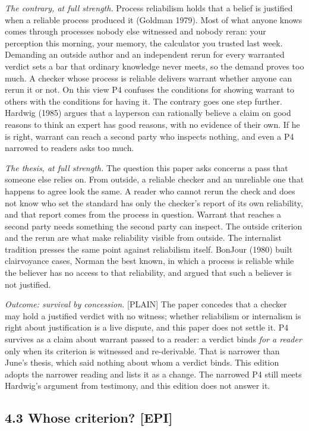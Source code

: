 \documentclass[11pt]{article}
\newcommand{\register}[1]{{\ttfamily\small #1}}
\begin{document}
\emph{The contrary, at full strength.} Process reliabilism holds that a belief is justified when a reliable process produced it (Goldman 1979). Most of what anyone knows comes through processes nobody else witnessed and nobody reran: your perception this morning, your memory, the calculator you trusted last week. Demanding an outside author and an independent rerun for every warranted verdict sets a bar that ordinary knowledge never meets, so the demand proves too much. A checker whose process is reliable delivers warrant whether anyone can rerun it or not. On this view P4 confuses the conditions for showing warrant to others with the conditions for having it. The contrary goes one step further. Hardwig (1985) argues that a layperson can rationally believe a claim on good reasons to think an expert has good reasons, with no evidence of their own. If he is right, warrant can reach a second party who inspects nothing, and even a P4 narrowed to readers asks too much.

\emph{The thesis, at full strength.} The question this paper asks concerns a pass that someone else relies on. From outside, a reliable checker and an unreliable one that happens to agree look the same. A reader who cannot rerun the check and does not know who set the standard has only the checker's report of its own reliability, and that report comes from the process in question. Warrant that reaches a second party needs something the second party can inspect. The outside criterion and the rerun are what make reliability visible from outside. The internalist tradition presses the same point against reliabilism itself. BonJour (1980) built clairvoyance cases, Norman the best known, in which a process is reliable while the believer has no access to that reliability, and argued that such a believer is not justified.

\emph{Outcome: survival by concession.} \register{[PLAIN]} The paper concedes that a checker may hold a justified verdict with no witness; whether reliabilism or internalism is right about justification is a live dispute, and this paper does not settle it. P4 survives as a claim about warrant passed to a reader: a verdict binds \emph{for a reader} only when its criterion is witnessed and re-derivable. That is narrower than June's thesis, which said nothing about whom a verdict binds. This edition adopts the narrower reading and lists it as a change. The narrowed P4 still meets Hardwig's argument from testimony, and this edition does not answer it.

\subsection*{4.3 Whose criterion? [EPI]}
\end{document}
